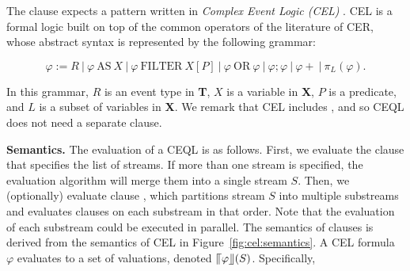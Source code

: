 \vspace{-30pt}

The  clause expects a pattern written in \emph{Complex Event Logic (CEL)} \cite{formal-framework-cep}. CEL is a formal logic built on top of the common operators of the literature of CER, whose abstract syntax is represented by the following grammar:

\vspace{-20pt}
\begin{equation*}
  \varphi := R    \ | \ \varphi \ \text{AS} \ X    \ | \    \varphi \ \text{FILTER} \ X[P]  \ | \   \varphi \ \text{OR} \ \varphi   \ | \  \varphi ; \varphi    \ | \  \varphi+ \ | \ \pi_{L}(\varphi).
\end{equation*}

\vspace{-10pt}
In this grammar, $R$ is an event type in \textbf{T}, $X$ is a variable in \textbf{X}, $P$ is a predicate, and $L$ is a subset of variables in \textbf{X}. We remark that CEL includes , and so CEQL does not need a separate  clause.

\textbf{Semantics.} The evaluation of a CEQL is as follows. First, we evaluate the  clause that specifies the list of streams. If more than one stream is specified, the evaluation algorithm will merge them into a single stream $S$. Then, we (optionally) evaluate clause , which partitions stream $S$ into multiple substreams and evaluates clauses  on each substream in that order. Note that the evaluation of each substream could be executed in parallel. The semantics of  clauses is derived from the semantics of CEL in Figure~\ref{fig:cel:semantics}. A CEL formula $\varphi$ evaluates to a set of valuations, denoted $\llceil \varphi \rrfloor(S)$. Specifically,

